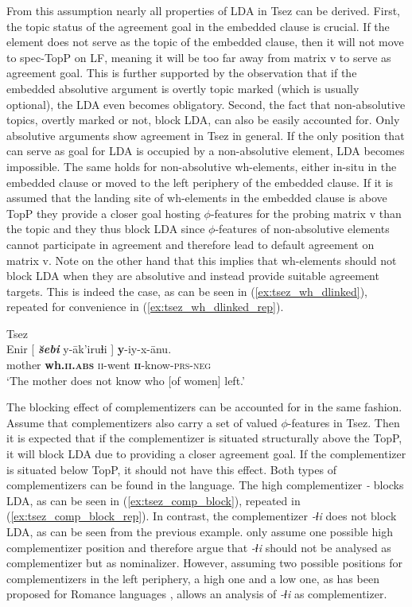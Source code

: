\documentclass[output=paper
,modfonts
,nonflat]{langsci/langscibook}
\begin{document}
From this assumption nearly all properties of LDA in Tsez can be derived. First, the topic status of the agreement goal in the embedded clause is crucial. If the element does not serve as the topic of the embedded clause, then it will not move to spec-TopP on LF, meaning it will be too far away from matrix v to serve as agreement goal. This is further supported by the observation that if the embedded absolutive argument is overtly topic marked (which is usually optional), the LDA even becomes obligatory. Second, the fact that non-absolutive topics, overtly marked or not, block LDA, can also be easily accounted for. Only absolutive arguments show agreement in Tsez in general. If the only position that can serve as goal for LDA is occupied by a non-absolutive element, LDA becomes impossible. The same holds for non-absolutive wh-elements, either in-situ in the embedded clause or moved to the left periphery of the embedded clause. If it is assumed that the landing site of wh-elements in the embedded clause is above TopP they provide a closer goal hosting $ \phi $-features for the probing matrix v than the topic and they thus block LDA since $ \phi $-features of non-absolutive elements cannot participate in agreement and therefore lead to default agreement on matrix v. Note on the other hand that this implies that wh-elements should not block LDA when they are absolutive and instead provide suitable agreement targets. This is indeed the case, as can be seen in (\ref{ex:tsez_wh_dlinked}), repeated for convenience in (\ref{ex:tsez_wh_dlinked_rep}).
\begin{exe}
\ex Tsez \citep[][fn. 20]{Polinsky_Potsdam2001}\label{ex:tsez_wh_dlinked_rep}\\
	\gll Enir [ \textbf{\textit{\u{s}ebi}} y-\=ak'iruɬi ] \textbf{y}-iy-x-\={a}nu.\\
		 mother {} \textbf{wh.\textsc{ii.abs}} \textsc{ii}-went {} \textbf{\textsc{ii}}-know-\textsc{prs-neg}\\
	\glt `The mother does not know who [of women] left.'
\end{exe}
The blocking effect of complementizers can be accounted for in the same fashion. Assume that complementizers also carry a set of valued $ \phi $-features in Tsez. Then it is expected that if the complementizer is situated structurally above the TopP, it will block LDA due to providing a closer agreement goal. If the complementizer is situated below TopP, it should not have this effect. Both types of complementizers can be found in the language. The high complementizer \textit{-\textcrlambdain} blocks LDA, as can be seen in (\ref{ex:tsez_comp_block}), repeated in (\ref{ex:tsez_comp_block_rep}). In contrast, the complementizer \textit{-ɬi} does not block LDA, as can be seen from the previous example. \citet{Polinsky_Potsdam2001} only assume one possible high complementizer position and therefore argue that \textit{-ɬi} should not be analysed as complementizer but as nominalizer. However, assuming two possible positions for complementizers in the left periphery, a high one and a low one, as has been proposed for Romance languages \citep{Ledgeway2005}, allows an analysis of \textit{-ɬi} as complementizer.
\end{document}
